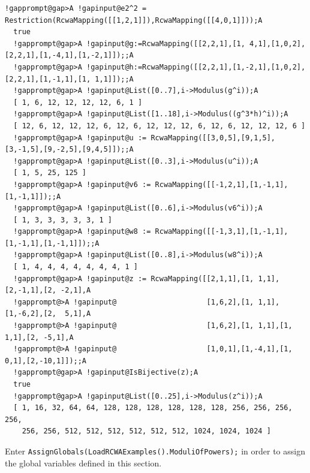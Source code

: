 \documentclass[a4paper,11pt]{report}
\begin{document}
{{\begin{Verbatim}[commandchars=!@A,fontsize=\small,frame=single,label=Example]
  !gapprompt@gap>A !gapinput@e2^2 = Restriction(RcwaMapping([[1,2,1]]),RcwaMapping([[4,0,1]]));A
  true
  !gapprompt@gap>A !gapinput@g:=RcwaMapping([[2,2,1],[1, 4,1],[1,0,2],[2,2,1],[1,-4,1],[1,-2,1]]);;A
  !gapprompt@gap>A !gapinput@h:=RcwaMapping([[2,2,1],[1,-2,1],[1,0,2],[2,2,1],[1,-1,1],[1, 1,1]]);;A
  !gapprompt@gap>A !gapinput@List([0..7],i->Modulus(g^i));A
  [ 1, 6, 12, 12, 12, 12, 6, 1 ]
  !gapprompt@gap>A !gapinput@List([1..18],i->Modulus((g^3*h)^i));A
  [ 12, 6, 12, 12, 12, 6, 12, 6, 12, 12, 12, 6, 12, 6, 12, 12, 12, 6 ]
  !gapprompt@gap>A !gapinput@u := RcwaMapping([[3,0,5],[9,1,5],[3,-1,5],[9,-2,5],[9,4,5]]);;A
  !gapprompt@gap>A !gapinput@List([0..3],i->Modulus(u^i));A
  [ 1, 5, 25, 125 ]
  !gapprompt@gap>A !gapinput@v6 := RcwaMapping([[-1,2,1],[1,-1,1],[1,-1,1]]);;A
  !gapprompt@gap>A !gapinput@List([0..6],i->Modulus(v6^i));A
  [ 1, 3, 3, 3, 3, 3, 1 ]
  !gapprompt@gap>A !gapinput@w8 := RcwaMapping([[-1,3,1],[1,-1,1],[1,-1,1],[1,-1,1]]);;A
  !gapprompt@gap>A !gapinput@List([0..8],i->Modulus(w8^i));A
  [ 1, 4, 4, 4, 4, 4, 4, 4, 1 ]
  !gapprompt@gap>A !gapinput@z := RcwaMapping([[2,1,1],[1, 1,1],[2,-1,1],[2, -2,1],A
  !gapprompt@>A !gapinput@                     [1,6,2],[1, 1,1],[1,-6,2],[2,  5,1],A
  !gapprompt@>A !gapinput@                     [1,6,2],[1, 1,1],[1, 1,1],[2, -5,1],A
  !gapprompt@>A !gapinput@                     [1,0,1],[1,-4,1],[1, 0,1],[2,-10,1]]);;A
  !gapprompt@gap>A !gapinput@IsBijective(z);A
  true
  !gapprompt@gap>A !gapinput@List([0..25],i->Modulus(z^i));A
  [ 1, 16, 32, 64, 64, 128, 128, 128, 128, 128, 128, 256, 256, 256, 256, 
    256, 256, 512, 512, 512, 512, 512, 512, 1024, 1024, 1024 ]
\end{Verbatim}
 Enter \texttt{AssignGlobals(LoadRCWAExamples().ModuliOfPowers);} in order to assign the global variables defined in this section. }

  
}
\end{document}
